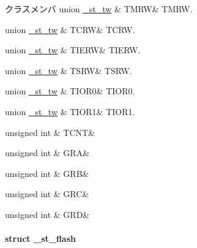 \begin{DoxyFields}{クラスメンバ}
union \hyperlink{3694s_8h_dd/d12/union__st__tw_8TMRW}{\+\_\+st\+\_\+tw}\label{3694s_8h_acb94c14d723129f2139521a5361be8de}
&
T\+M\+R\+W&
T\+M\+R\+W. \\
\hline

union \hyperlink{3694s_8h_d2/d54/union__st__tw_8TCRW}{\+\_\+st\+\_\+tw}\label{3694s_8h_a2761b532679d776dea95d5119f86d287}
&
T\+C\+R\+W&
T\+C\+R\+W. \\
\hline

union \hyperlink{3694s_8h_dd/d15/union__st__tw_8TIERW}{\+\_\+st\+\_\+tw}\label{3694s_8h_a2909dce5cad0c74e2429a087ae423de6}
&
T\+I\+E\+R\+W&
T\+I\+E\+R\+W. \\
\hline

union \hyperlink{3694s_8h_de/d76/union__st__tw_8TSRW}{\+\_\+st\+\_\+tw}\label{3694s_8h_a9989482768963a2a73944a7eba4e566d}
&
T\+S\+R\+W&
T\+S\+R\+W. \\
\hline

union \hyperlink{3694s_8h_d7/de2/union__st__tw_8TIOR0}{\+\_\+st\+\_\+tw}\label{3694s_8h_ad10302bd4bc2a46cb7496b5e0f9e7765}
&
T\+I\+O\+R0&
T\+I\+O\+R0. \\
\hline

union \hyperlink{3694s_8h_d6/dce/union__st__tw_8TIOR1}{\+\_\+st\+\_\+tw}\label{3694s_8h_a133e2b44c75631006ff08f5945fd0b61}
&
T\+I\+O\+R1&
T\+I\+O\+R1. \\
\hline

unsigned int\label{3694s_8h_aec13300961b67454ce5d81e53e8ce968}
&
T\+C\+N\+T&
\\
\hline

unsigned int\label{3694s_8h_ac2d9f626f2ec5daf376ed618da324e21}
&
G\+R\+A&
\\
\hline

unsigned int\label{3694s_8h_a8c4c869b89f1e8b753c6580f041ead09}
&
G\+R\+B&
\\
\hline

unsigned int\label{3694s_8h_a5d5c4f1acae604d1ae24430055edf131}
&
G\+R\+C&
\\
\hline

unsigned int\label{3694s_8h_a07e8ba9d2304438f22731ea472c31e3d}
&
G\+R\+D&
\\
\hline

\end{DoxyFields}
\label{struct__st__flash}
\paragraph{struct \+\_\+st\+\_\+flash}



